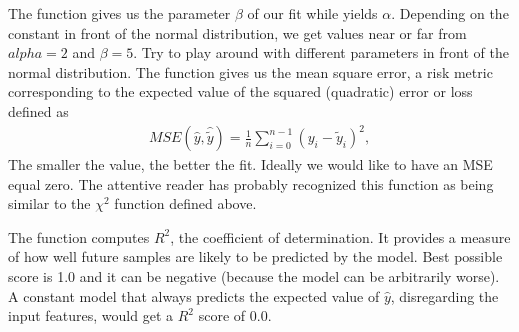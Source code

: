 \documentclass[letterpaper,10pt,english]{sphinxmanual}
\begin{document}
\begin{sphinxVerbatim}[commandchars=\\\{\}]
  
\PYG{p}{[} \PYG{p}{]}
\end{sphinxVerbatim}

The function  gives us the parameter \(\beta\) of our fit while  yields
\(\alpha\). Depending on the constant in front of the normal distribution, we get values near or far from \(alpha =2\) and \(\beta =5\). Try to play around with different parameters in front of the normal distribution. The function  gives us the mean square error, a risk metric corresponding to the expected value of the squared (quadratic) error or loss defined as
\begin{equation*}
\begin{split}
MSE(\hat{y},\hat{\tilde{y}}) = \frac{1}{n}
\sum_{i=0}^{n-1}(y_i-\tilde{y}_i)^2,
\end{split}
\end{equation*}
The smaller the value, the better the fit. Ideally we would like to
have an MSE equal zero.  The attentive reader has probably recognized
this function as being similar to the \(\chi^2\) function defined above.

The  function computes \(R^2\), the coefficient of
determination. It provides a measure of how well future samples are
likely to be predicted by the model. Best possible score is 1.0 and it
can be negative (because the model can be arbitrarily worse). A
constant model that always predicts the expected value of \(\hat{y}\),
disregarding the input features, would get a \(R^2\) score of \(0.0\).
\end{document}

